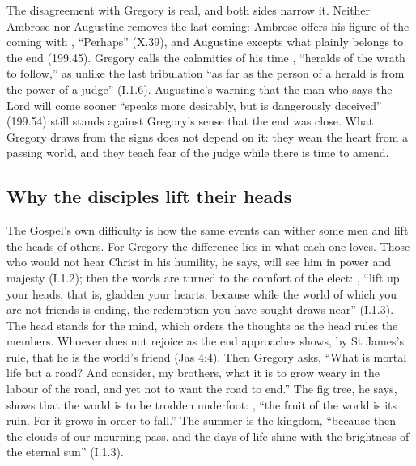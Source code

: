 The disagreement with Gregory is real, and both sides narrow it. Neither
Ambrose nor Augustine removes the last coming: Ambrose offers his figure of
the coming with , ``Perhaps'' (X.39), and Augustine excepts
what plainly belongs to the end (199.45). Gregory calls the calamities of his
time , ``heralds of the wrath to follow,'' as
unlike the last tribulation ``as far as the person of a herald is from the
power of a judge'' (I.1.6). Augustine's warning that the man who says the
Lord will come sooner ``speaks more desirably, but is dangerously deceived''
(199.54) still stands against Gregory's sense that the end was close. What
Gregory draws from the signs does not depend on it: they wean the heart from
a passing world, and they teach fear of the judge while there is time to
amend.

\subsection{Why the disciples lift their heads}

The Gospel's own difficulty is how the same events can wither some men and
lift the heads of others. For Gregory the difference lies in what each one loves. Those who
would not hear Christ in his humility, he says, will see him in power and
majesty (I.1.2); then the words are turned to the comfort of the elect:
, ``lift up your heads, that
is, gladden your hearts, because while the world of which you are not friends
is ending, the redemption you have sought draws near'' (I.1.3). The head
stands for the mind, which orders the thoughts as the head rules the members.
Whoever does not rejoice as the end approaches shows, by St James's rule, that
he is the world's friend (Jas 4:4). Then Gregory asks,  ``What is mortal life but a road? And consider, my
brothers, what it is to grow weary in the labour of the road, and yet not to
want the road to end.'' The fig tree, he says, shows that the world is to be
trodden underfoot: , ``the fruit of the world is its ruin. For it grows in order to fall.''
The summer is the kingdom, ``because then the clouds of our mourning pass, and
the days of life shine with the brightness of the eternal sun'' (I.1.3).

